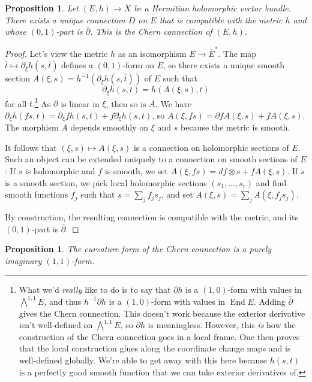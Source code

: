 \documentclass[10pt,a4paper]{article}
\newtheorem{prop}[theo]{Proposition}
\newtheorem*{proof}{Proof}
\def\ov#1{\overline{#1}}
\DeclareMathOperator{\End}{End}
\begin{document}
\begin{prop}
Let $(E, h) \to X$ be a Hermitian holomorphic vector bundle. There exists a unique connection $D$ on $E$ that is compatible with the metric $h$ and whose $(0,1)$-part is $\bar\partial$. This is the \emph{Chern connection} of $(E,h)$.
\end{prop}

\begin{proof}
Let's view the metric $h$ as an isomorphism $E \to \overline E^*$. The map $\ov t \mapsto \partial_\xi h(s, \ov t)$ defines a $(0,1)$-form on $E$, so there exists a unique smooth section $A(\xi,s) = h^{-1}(\partial_\xi h(s, \ov t))$ of $E$ such that
$$
\partial_\xi h(s, t) = h(A(\xi, s), t)
$$
for all $t$.\footnote{What we'd \emph{really} like to do is to say that $\partial h$ is a $(1,0)$-form with values in $\bigwedge^{1,1}E$, and thus $h^{-1}\partial h$ is a $(1,0)$-form with values in $\End E$. Adding $\bar\partial$ gives the Chern connection. This doesn't work because the exterior derivative isn't well-defined on $\bigwedge^{1,1}E$, so $\partial h$ is meaningless. However, this \emph{is} how the construction of the Chern connection goes in a local frame. One then proves that the local construction glues along the coordinate change maps and is well-defined globally. We're able to get away with this here because $h(s,t)$ is a perfectly good smooth function that we can take exterior derivatives of.}
As $\partial$ is linear in $\xi$, then so is $A$. We have $\partial_\xi h(f s, t) = \partial_\xi f h(s,t) + f \partial_\xi h(s, t)$, so $A(\xi, fs) = \partial f A(\xi, s) + f A(\xi, s)$. The morphism $A$ depends smoothly on $\xi$ and $s$ because the metric is smooth.

It follows that $(\xi, s) \mapsto A(\xi, s)$ is a connection on holomorphic sections of $E$. Such an object can be extended uniquely to a connection on smooth sections of $E$: If $s$ is holomorphic and $f$ is smooth, we set $A(\xi, f s) = df \otimes s + f A(\xi, s)$. If $s$ is a smooth section, we pick local holomorphic sections $(s_1, \ldots, s_r)$ and find smooth functions $f_j$ such that $s = \sum_j f_j s_j$, and set $A(\xi,s) = \sum_j A(\xi, f_j s_j)$.

By construction, the resulting connection is compatible with the metric, and its $(0,1)$-part is $\bar\partial$.
\end{proof}


\begin{prop}
The curvature form of the Chern connection is a purely imaginary $(1,1)$-form.
\end{prop}
\end{document}
